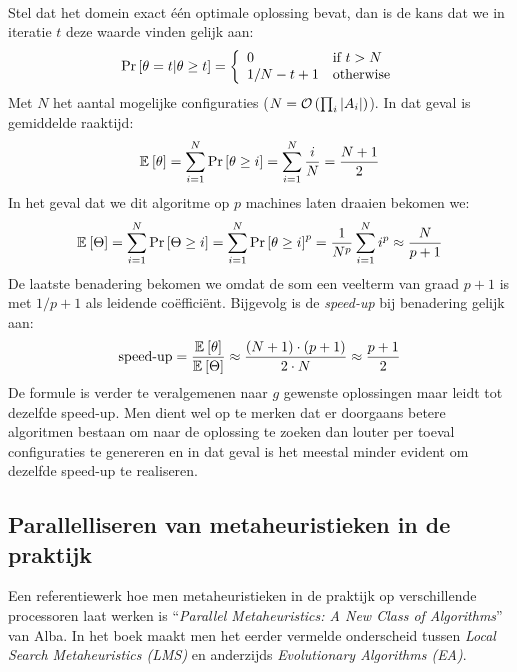 \paragraph{}
Stel dat het domein exact \'e\'en optimale oplossing bevat, dan is de kans dat we in iteratie $t$ deze waarde vinden gelijk aan:
\begin{equation}
\Pr\left[\theta=t|\theta\geq t\right]=\left\{\begin{array}{ll}
0&\mbox{if }t>N\\
1/N-t+1&\mbox{otherwise}
\end{array}\right.
\end{equation}
Met $N$ het aantal mogelijke configuraties ($N=\mathcal{O}\left(\prod_i\left| A_i\right|\right)$). In dat geval is gemiddelde raaktijd:
\begin{equation}
\mathbb{E}_{}\left[\theta\right]=\displaystyle\sum_{i=1}^N\Pr\left[\theta\geq i\right]=\displaystyle\sum_{i=1}^N\displaystyle\frac{i}{N}=\displaystyle\frac{N+1}{2}
\end{equation}
In het geval dat we dit algoritme op $p$ machines laten draaien bekomen we:
\begin{equation}
\mathbb{E}_{}\left[\Theta\right]=\displaystyle\sum_{i=1}^N\Pr\left[\Theta\geq i\right]=\displaystyle\sum_{i=1}^N\Pr\left[\theta\geq i\right]^p=\displaystyle\frac{1}{N^p}\displaystyle\sum_{i=1}^Ni^p\approx\displaystyle\frac{N}{p+1}
\end{equation}
De laatste benadering bekomen we omdat de som een veelterm van graad $p+1$ is met $1/p+1$ als leidende co\"effici\"ent. Bijgevolg is de \emph{speed-up} bij benadering gelijk aan:
\begin{equation}
\mbox{speed-up}=\displaystyle\frac{\mean{\hittime}}{\mean{\phittime}}\approx\displaystyle\frac{\brak{N+1}\cdot\brak{p+1}}{2\cdot N}\approx\displaystyle\frac{p+1}{2}
\eqnlab{minimalSpeedupMetaheuristic}
\end{equation}
De formule is verder te veralgemenen naar $g$ gewenste oplossingen maar leidt tot dezelfde speed-up. Men dient wel op te merken dat er doorgaans betere algoritmen bestaan om naar de oplossing te zoeken dan louter per toeval configuraties te genereren en in dat geval is het meestal minder evident om dezelfde speed-up te realiseren.



\subsection{Parallelliseren van metaheuristieken in de praktijk}

Een referentiewerk hoe men metaheuristieken in de praktijk op verschillende processoren laat werken is ``\emph{Parallel Metaheuristics: A New Class of Algorithms}'' van Alba\cite{Alba2005book}. In het boek maakt men het eerder vermelde onderscheid tussen \emph{Local Search Metaheuristics (LMS)} en anderzijds \emph{Evolutionary Algorithms (EA)}.

